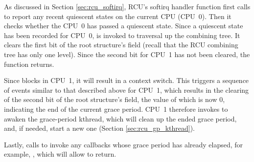 As discussed in Section \ref{sec:rcu_softirq}, RCU's softirq handler function  
first calls  to report any recent quiescent states on the 
current CPU (CPU~0). Then it checks whether the CPU~0 has passed a quiescent state. Since 
a quiescent state has been recorded for CPU~0,  is invoked to traversal
up the combining tree. It clears the first bit of the root  structure's  
field (recall that the RCU combining tree has only one level). Since the second bit for CPU~1 has 
not been cleared, the function returns.

Since  blocks in CPU~1, it will result in a context switch. 
This triggers a sequence of events similar to that described above for
CPU~1, which results in the clearing of the
second bit of the root  structure's  field, the value of which is now 0, indicating the end of the current grace period.
CPU~1 therefore invokes  to 
awaken the grace-period kthread, 
which will clean up the ended grace period, and, if needed, 
start a new one (Section \ref{sec:rcu_gp_kthread}).

Lastly,  calls  to invoke any callbacks whose
grace period has already elapsed, for example, ,
which will allow  to return.

